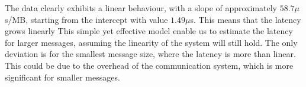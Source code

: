 \begin{figure}[H]
{
        }
    \end{figure}
    The data clearly exhibits a linear behaviour, with a slope of
    approximately $58.7 \mu$s/MB, starting from the intercept with
    value $1.49 \mu$s. This means that the latency grows linearly
    This simple yet effective model enable us to estimate the latency
    for larger messages, assuming the linearity of the system will
    still hold. The only deviation is for the smallest message size,
    where the latency is more than linear. This could be due to the
    overhead of the communication system, which is more significant
    for smaller messages.


